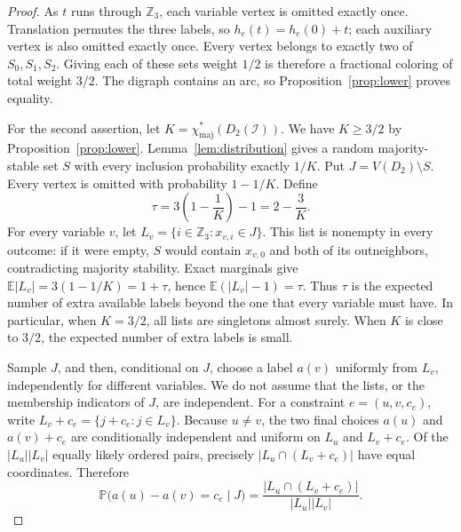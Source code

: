\documentclass[12pt]{article}
\newcommand{\Pp}{\mathbb P}
\newcommand{\E}{\mathbb E}
\newcommand{\chif}{\chi^*_{\mathrm{maj}}}
\newcommand{\abs}[1]{|#1|}
\begin{document}
\begin{proof}
As \(t\) runs through \(\mathbb Z_3\), each variable vertex is omitted exactly once. Translation permutes the three labels, so \(h_e(t)=h_e(0)+t\); each auxiliary vertex is also omitted exactly once. Every vertex belongs to exactly two of \(S_0,S_1,S_2\). Giving each of these sets weight \(1/2\) is therefore a fractional coloring of total weight \(3/2\). The digraph contains an arc, so Proposition~\ref{prop:lower} proves equality.

For the second assertion, let $K=\chif(D_2(\mathcal I))$. We have \(K\ge3/2\) by Proposition~\ref{prop:lower}. Lemma~\ref{lem:distribution} gives a random majority-stable set \(S\) with every inclusion probability exactly \(1/K\). Put \(J=V(D_2)\setminus S\). Every vertex is omitted with probability \(1-1/K\). Define
\begin{equation}\label{eq:tau}
\tau=3\left(1-\frac1K\right)-1=2-\frac3K.
\end{equation}
For every variable \(v\), let \(L_v=\{i\in\mathbb Z_3:x_{v,i}\in J\}\). This list is nonempty in every outcome: if it were empty, \(S\) would contain \(x_{v,0}\) and both of its outneighbors, contradicting majority stability. Exact marginals give \(\E\abs{L_v}=3(1-1/K)=1+\tau\), hence \(\E(\abs{L_v}-1)=\tau\). Thus \(\tau\) is the expected number of extra available labels beyond the one that every variable must have. In particular, when \(K=3/2\), all lists are singletons almost surely. When \(K\) is close to \(3/2\), the expected number of extra labels is small.

Sample \(J\), and then, conditional on \(J\), choose a label \(a(v)\) uniformly from \(L_v\), independently for different variables. We do not assume that the lists, or the membership indicators of \(J\), are independent. For a constraint \(e=(u,v,c_e)\), write \(L_v+c_e=\{j+c_e:j\in L_v\}\). Because \(u\ne v\), the two final choices \(a(u)\) and \(a(v)+c_e\) are conditionally independent and uniform on \(L_u\) and \(L_v+c_e\). Of the \(\abs{L_u}\abs{L_v}\) equally likely ordered pairs, precisely \(\abs{L_u\cap(L_v+c_e)}\) have equal coordinates. Therefore
\begin{equation}\label{eq:listviolation}
\Pp\bigl(a(u)-a(v)=c_e\mid J\bigr)
=\frac{\abs{L_u\cap(L_v+c_e)}}{\abs{L_u}\abs{L_v}}.
\end{equation}


\end{proof}
\end{document}
